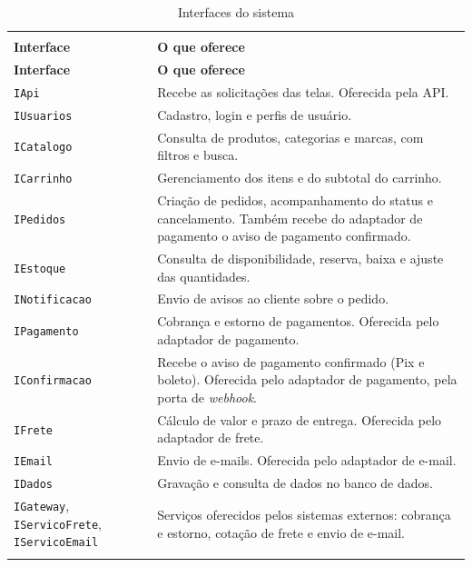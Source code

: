 \documentclass[12pt,a4paper]{article}
\begin{document}
{\setlength{\arrayrulewidth}{0.3pt}\renewcommand{\arraystretch}{1.15}
\begin{xltabular}{\textwidth}{>{\raggedright\arraybackslash}p{3.6cm}|>{\raggedright\arraybackslash}X}
\caption{Interfaces do sistema}\\
\toprule{}
\textbf{Interface} & \textbf{O que oferece}\\ \midrule{}
\endfirsthead
{}\toprule{}
\textbf{Interface} & \textbf{O que oferece}\\ \midrule{}
\endhead
\endlastfoot
\texttt{IApi} & Recebe as solicitações das telas. Oferecida pela API.\\ \hline
\texttt{IUsuarios} & Cadastro, login e perfis de usuário.\\ \hline
\texttt{ICatalogo} & Consulta de produtos, categorias e marcas, com filtros e busca.\\ \hline
\texttt{ICarrinho} & Gerenciamento dos itens e do subtotal do carrinho.\\ \hline
\texttt{IPedidos} & Criação de pedidos, acompanhamento do status e cancelamento. Também recebe do adaptador de pagamento o aviso de pagamento confirmado.\\ \hline
\texttt{IEstoque} & Consulta de disponibilidade, reserva, baixa e ajuste das quantidades.\\ \hline
\texttt{INotificacao} & Envio de avisos ao cliente sobre o pedido.\\ \hline
\texttt{IPagamento} & Cobrança e estorno de pagamentos. Oferecida pelo adaptador de pagamento.\\ \hline
\texttt{IConfirmacao} & Recebe o aviso de pagamento confirmado (Pix e boleto). Oferecida pelo adaptador de pagamento, pela porta de \emph{webhook}.\\ \hline
\texttt{IFrete} & Cálculo de valor e prazo de entrega. Oferecida pelo adaptador de frete.\\ \hline
\texttt{IEmail} & Envio de e-mails. Oferecida pelo adaptador de e-mail.\\ \hline
\texttt{IDados} & Gravação e consulta de dados no banco de dados.\\ \hline
\texttt{IGateway}, \texttt{IServicoFrete}, \texttt{IServicoEmail} & Serviços oferecidos pelos sistemas externos: cobrança e estorno, cotação de frete e envio de e-mail.\\ \bottomrule
\end{xltabular}}
\end{document}
